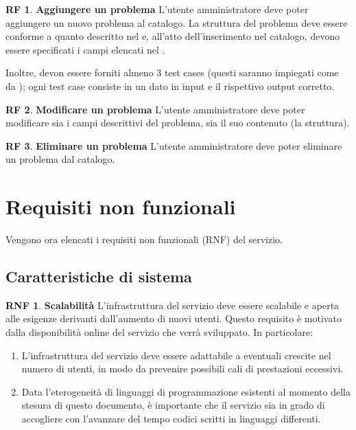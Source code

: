 \documentclass[11pt, a4paper]{article}
\theoremstyle{definition}
\newtheorem{funcreq}{RF} %
\newtheorem{nonfuncreq}{RNF} %
\begin{document}
\begin{funcreq}
\textbf{Aggiungere un problema }
L'utente amministratore deve poter aggiungere un nuovo problema al catalogo.
La struttura del problema deve essere conforme a quanto descritto nel
\textcolor{blue}{}
e, all'atto dell'inserimento nel catalogo, devono essere specificati i campi
elencati nel \textcolor{blue}{}.

Inoltre, devon essere forniti almeno 3 test cases (questi saranno impiegati
come da \textcolor{blue}{});
ogni test case consiste in un dato in input e il rispettivo output corretto.
\end{funcreq}

\begin{funcreq}
\textbf{Modificare un problema }
L'utente amministratore deve poter modificare sia i campi descrittivi del
problema, sia il suo contenuto (la struttura).
\end{funcreq}

\begin{funcreq}
\textbf{Eliminare un problema }
L'utente amministratore deve poter eliminare un problema dal catalogo.
\end{funcreq}

\newpage
\section{Requisiti non funzionali}
Vengono ora elencati i requisiti non funzionali (RNF) del servizio.

\subsection{Caratteristiche di sistema}

\begin{nonfuncreq}
\label{scalabilita}
\textbf{Scalabilità }
L'infrastruttura del servizio deve essere scalabile e aperta alle esigenze
derivanti dall'aumento di nuovi utenti. Questo requisito è motivato dalla
disponibilità online del servizio che verrà sviluppato. In particolare:
\begin{enumerate}
    \item L'infrastruttura del servizio deve essere adattabile a eventuali
    crescite nel numero di utenti, in modo da prevenire possibili cali di
    prestazioni eccessivi.

    \item Data l'eterogeneità di linguaggi di programmazione esistenti
    al momento della stesura di questo documento, è importante che il
    servizio sia in grado di accogliere con l'avanzare del tempo codici
    scritti in linguaggi differenti.
\end{enumerate}
\end{nonfuncreq}
\end{document}
